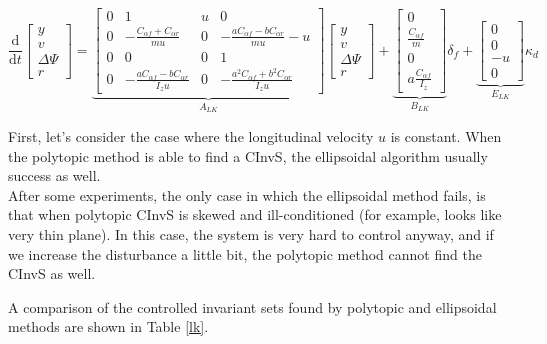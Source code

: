 \documentclass{article}
\begin{document}
\begin{equation}
\label{eq:lk}
\frac{\mathrm{d}}{\mathrm{d}t} \begin{bmatrix} y \\ v \\ \Delta \Psi \\ r \end{bmatrix}
=  \underbrace{\begin{bmatrix} 0 & 1 & u & 0 \\
	0 & -\frac{ C_{\alpha f} + C_{\alpha r} }{ mu } & 0 & -\frac{a C_{\alpha f} - b C_{\alpha r}}{ mu } - u \\
	0 & 0 & 0 & 1  \\
	0 & -\frac{a C_{\alpha f} - b C_{\alpha r} }{ I_{z} u } & 0 & -\frac{a^2 C_{\alpha f} + b^2 C_{\alpha r} }{ I_{z} u }
	\end{bmatrix}}_{A_{LK}}
\begin{bmatrix} y \\ v \\ \Delta \Psi \\ r \end{bmatrix}
+
\underbrace{\begin{bmatrix} 0 \\ \frac{C_{\alpha f} }{m} \\ 0 \\ a \frac{C_{\alpha f} }{I_{z}} \end{bmatrix}}_{B_{LK}} \delta_f 
+  
\underbrace{\begin{bmatrix} 0 \\ 0 \\ -u \\ 0 \end{bmatrix}}_{E_{LK}} \kappa_{d}
\end{equation}

First, let's consider the case where the longitudinal velocity $u$ is constant. When the polytopic method is able to find a CInvS, the ellipsoidal algorithm usually success as well. \\

After some experiments, the only case in which the ellipsoidal method fails, is that when polytopic CInvS is skewed and ill-conditioned (for example, looks like very thin plane). In this case, the system is very hard to control anyway, and if we increase the disturbance a little bit, the polytopic method cannot find the CInvS as well.

A comparison of the controlled invariant sets found by polytopic and ellipsoidal methods are shown in Table \ref{lk}.
\end{document}
